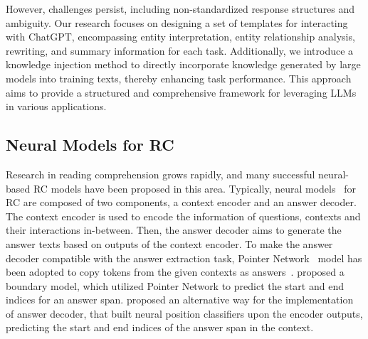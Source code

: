 However, challenges persist, including non-standardized response structures and ambiguity. 
Our research focuses on designing a set of templates for interacting with ChatGPT, encompassing entity interpretation, entity relationship analysis, rewriting, and summary information for each task. 
Additionally, we introduce a knowledge injection method to directly incorporate knowledge generated by large models into training texts, thereby enhancing task performance. 
This approach aims to provide a structured and comprehensive framework for leveraging LLMs in various applications.


\subsection{Neural Models for RC}
Research in reading comprehension grows rapidly, and many successful neural-based RC models have been proposed in this area. 
Typically, neural  models~\citep{DBLP:conf/aaai/PangLGXSC19,DBLP:conf/iclr/Wang017a,DBLP:conf/iclr/XiongZS17} for RC are composed of two components, a context encoder and an answer decoder. 
The context encoder is used to encode the information of questions, contexts and their interactions in-between. Then, the answer decoder aims to generate the answer texts based on outputs of the context encoder. 
To make the answer decoder compatible with the answer extraction task, 
Pointer Network~\citep{DBLP:conf/nips/VinyalsFJ15} model has been adopted to
copy tokens from the given contexts as answers~\citep{DBLP:conf/acl/KadlecSBK16,DBLP:conf/emnlp/TrischlerYYBSS16}.
\cite{DBLP:conf/iclr/Wang017a} proposed a boundary model, which utilized Pointer Network to predict the start and end indices for an answer span.
\cite{DBLP:conf/iclr/SeoKFH17} proposed an alternative way for the implementation of answer decoder, that built neural position classifiers upon the encoder outputs, predicting the start and end indices of the answer span in the context.

